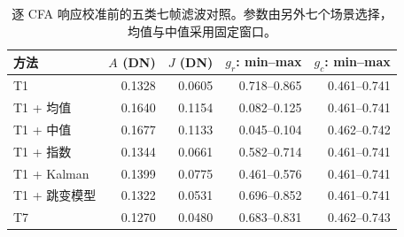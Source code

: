 \begin{table}[!t]
\centering
\caption{逐 CFA 响应校准前的五类七帧滤波对照。参数由另外七个场景选择，均值与中值采用固定窗口。}\label{tab:filters_raw}
\footnotesize
\begin{tabular}{lrrrr}
\toprule
方法 & $A$ (DN) & $J$ (DN) & $g_r$: min--max & $g_c$: min--max \\
\midrule
T1 & 0.1328 & 0.0605 & 0.718--0.865 & 0.461--0.741 \\
T1 + 均值 & 0.1640 & 0.1154 & 0.082--0.125 & 0.461--0.741 \\
T1 + 中值 & 0.1677 & 0.1133 & 0.045--0.104 & 0.462--0.742 \\
T1 + 指数 & 0.1344 & 0.0661 & 0.582--0.714 & 0.461--0.741 \\
T1 + Kalman & 0.1399 & 0.0775 & 0.461--0.576 & 0.461--0.741 \\
T1 + 跳变模型 & 0.1322 & 0.0531 & 0.696--0.852 & 0.461--0.741 \\
T7 & 0.1270 & 0.0480 & 0.683--0.831 & 0.462--0.743 \\
\bottomrule
\end{tabular}
\end{table}
